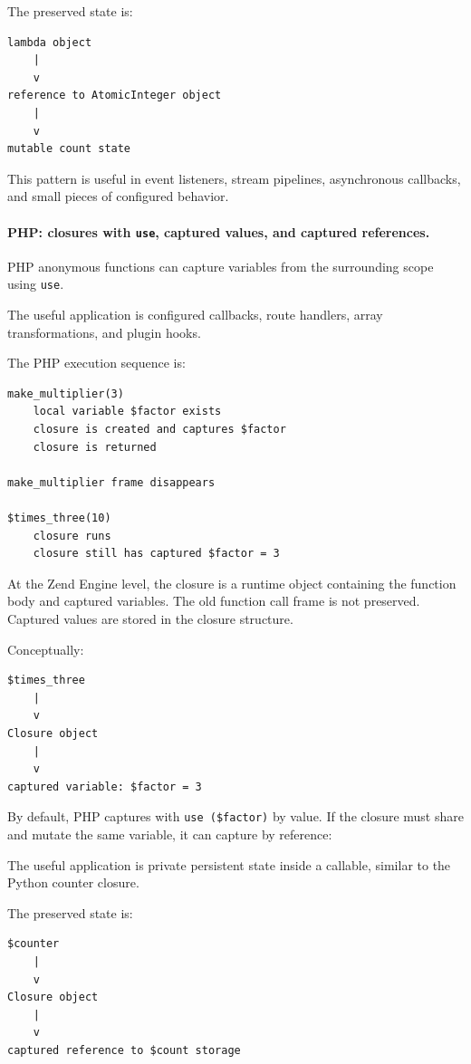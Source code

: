 The preserved state is:

\begin{verbatim}
lambda object
    |
    v
reference to AtomicInteger object
    |
    v
mutable count state
\end{verbatim}

This pattern is useful in event listeners, stream pipelines, asynchronous callbacks, and small pieces of configured behavior.

\paragraph{PHP: closures with \texttt{use}, captured values, and captured references.}

PHP anonymous functions can capture variables from the surrounding scope using \texttt{use}.

The useful application is configured callbacks, route handlers, array transformations, and plugin hooks.

The PHP execution sequence is:

\begin{verbatim}
make_multiplier(3)
    local variable $factor exists
    closure is created and captures $factor
    closure is returned

make_multiplier frame disappears

$times_three(10)
    closure runs
    closure still has captured $factor = 3
\end{verbatim}

At the Zend Engine level, the closure is a runtime object containing the function body and captured variables. The old function call frame is not preserved. Captured values are stored in the closure structure.

Conceptually:

\begin{verbatim}
$times_three
    |
    v
Closure object
    |
    v
captured variable: $factor = 3
\end{verbatim}

By default, PHP captures with \texttt{use (\$factor)} by value. If the closure must share and mutate the same variable, it can capture by reference:

The useful application is private persistent state inside a callable, similar to the Python counter closure.

The preserved state is:

\begin{verbatim}
$counter
    |
    v
Closure object
    |
    v
captured reference to $count storage
\end{verbatim}


